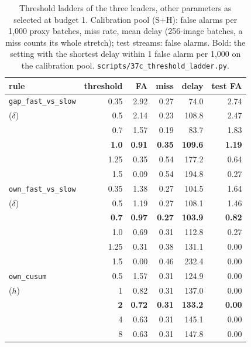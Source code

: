 \documentclass[10pt]{article}
\newcommand{\rl}[1]{\texttt{#1}}
\begin{document}
\begin{table}[t]
  \centering\small\setlength{\tabcolsep}{5pt}
  \caption{Threshold ladders of the three leaders, other parameters as selected at budget 1. Calibration pool (S+H): false alarms per 1,000 proxy batches, miss rate, mean delay (256-image batches, a miss counts its whole stretch); test streams: false alarms. Bold: the setting with the shortest delay within 1 false alarm per 1,000 on the calibration pool. \rl{scripts/37c\_threshold\_ladder.py}.}
  \label{tab:ladder}
  \begin{tabular}{@{}l r rrr r@{}}
    \toprule
    rule & threshold & FA & miss & delay & test FA \\
    \midrule
    \rl{gap\_fast\_vs\_slow} & 0.35 & 2.92 & 0.27 & 74.0 & 2.74 \\
    ($\delta$) & 0.5 & 2.14 & 0.23 & 108.8 & 2.47 \\
     & 0.7 & 1.57 & 0.19 & 83.7 & 1.83 \\
     & \textbf{1.0} & \textbf{0.91} & \textbf{0.35} & \textbf{109.6} & \textbf{1.19} \\
     & 1.25 & 0.35 & 0.54 & 177.2 & 0.64 \\
     & 1.5 & 0.09 & 0.54 & 194.8 & 0.27 \\
    \midrule
    \rl{own\_fast\_vs\_slow} & 0.35 & 1.38 & 0.27 & 104.5 & 1.64 \\
    ($\delta$) & 0.5 & 1.19 & 0.27 & 108.1 & 1.46 \\
     & \textbf{0.7} & \textbf{0.97} & \textbf{0.27} & \textbf{103.9} & \textbf{0.82} \\
     & 1.0 & 0.69 & 0.31 & 112.8 & 0.27 \\
     & 1.25 & 0.31 & 0.38 & 131.1 & 0.00 \\
     & 1.5 & 0.00 & 0.46 & 232.4 & 0.00 \\
    \midrule
    \rl{own\_cusum} & 0.5 & 1.57 & 0.31 & 124.9 & 0.00 \\
    ($h$) & 1 & 0.82 & 0.31 & 137.0 & 0.00 \\
     & \textbf{2} & \textbf{0.72} & \textbf{0.31} & \textbf{133.2} & \textbf{0.00} \\
     & 4 & 0.63 & 0.31 & 145.1 & 0.00 \\
     & 8 & 0.63 & 0.31 & 147.8 & 0.00 \\
    \bottomrule
  \end{tabular}
\end{table}
\end{document}
